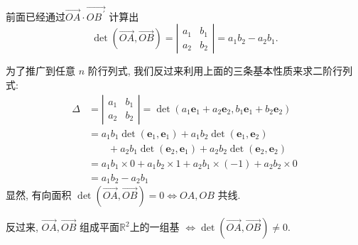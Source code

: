 \documentclass[10pt,punct]{ctexbeamer}
\begin{document}
\begin{frame}
    前面已经通过$\overrightarrow{O A} \cdot \overrightarrow{O B^{\, \prime}}$ 计算出
    $$\operatorname{det}(\overrightarrow{O A}, \overrightarrow{O B})=\left|\begin{array}{ll}a_1 & b_1 \\ a_2 & b_2\end{array}\right|=a_1 b_2-a_2 b_1.$$


    为了推广到任意 $n$ 阶行列式, 我们反过来利用上面的三条基本性质来求二阶行列式:
    $$\begin{aligned} \Delta &=\left|\begin{array}{cc}a_1 & b_1 \\ a_2 & b_2\end{array}\right|=\operatorname{det}\left(a_1 \boldsymbol{e}_1+a_2 \boldsymbol{e}_2, b_1 \boldsymbol{e}_1+b_2 \boldsymbol{e}_2\right) \\
        & = a_1 b_1 \operatorname{det}\left(\boldsymbol{e}_1, \boldsymbol{e}_1\right)
        +a_1 b_2 \operatorname{det}\left(\boldsymbol{e}_1, \boldsymbol{e}_2\right)\\
        & \qquad
        +a_2 b_1 \operatorname{det}\left(\boldsymbol{e}_2, \boldsymbol{e}_1\right)
        +a_2 b_2 \operatorname{det}\left(\boldsymbol{e}_2, \boldsymbol{e}_2\right) \\
        & = a_1 b_1 \times 0+a_1 b_2 \times 1+a_2 b_1 \times(-1)+a_2 b_2 \times 0 \\ &=a_1 b_2-a_2 b_1 \end{aligned}$$
    显然, 有向面积 $\operatorname{det}(\overrightarrow{O A}, \overrightarrow{O B})=0 \Leftrightarrow O A, O B$ 共线.


    反过来, $\overrightarrow{O A}, \overrightarrow{O B}$ 组成平面$\mathbb{R}^2$上的一组基 $\Leftrightarrow \operatorname{det}(\overrightarrow{O A}, \overrightarrow{O B}) \neq 0$.

\end{frame}
\end{document}
